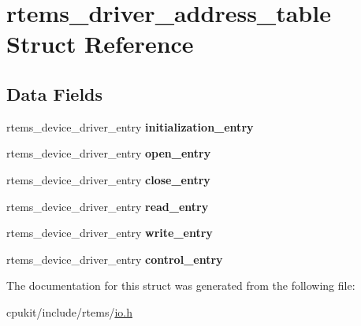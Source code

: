 \hypertarget{structrtems__driver__address__table}{}\section{rtems\+\_\+driver\+\_\+address\+\_\+table Struct Reference}
\label{structrtems__driver__address__table}
\subsection*{Data Fields}
\begin{DoxyCompactItemize}
\item 
\mbox{\label{structrtems__driver__address__table_a6165193d4c46c0fb77185c3c3596b23b}} 
rtems\+\_\+device\+\_\+driver\+\_\+entry {\bfseries initialization\+\_\+entry}
\item 
\mbox{\label{structrtems__driver__address__table_aa11ac440fa2ed9145542ed59b8d6d569}} 
rtems\+\_\+device\+\_\+driver\+\_\+entry {\bfseries open\+\_\+entry}
\item 
\mbox{\label{structrtems__driver__address__table_acd209365a0915b78319b3f6993684720}} 
rtems\+\_\+device\+\_\+driver\+\_\+entry {\bfseries close\+\_\+entry}
\item 
\mbox{\label{structrtems__driver__address__table_acbb3108bb3a034ff050472fd21a8a524}} 
rtems\+\_\+device\+\_\+driver\+\_\+entry {\bfseries read\+\_\+entry}
\item 
\mbox{\label{structrtems__driver__address__table_a3ebe2eb197e701f19fbd1e1e19ec1b51}} 
rtems\+\_\+device\+\_\+driver\+\_\+entry {\bfseries write\+\_\+entry}
\item 
\mbox{\label{structrtems__driver__address__table_a927eaba53f103bc8a767ca96cf2f9776}} 
rtems\+\_\+device\+\_\+driver\+\_\+entry {\bfseries control\+\_\+entry}
\end{DoxyCompactItemize}


The documentation for this struct was generated from the following file\+:\begin{DoxyCompactItemize}
\item 
cpukit/include/rtems/\mbox{\hyperlink{cpukit_2include_2rtems_2io_8h}{io.\+h}}\end{DoxyCompactItemize}
